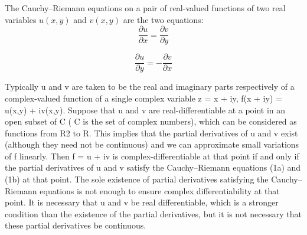 The Cauchy–Riemann equations on a pair of real-valued functions of two real variables $u(x,y)$ and $v(x,y)$ are the two equations:
\[\dfrac{ \partial u }{ \partial x } = \dfrac{ \partial v }{ \partial y }\]

\[\dfrac{ \partial u }{ \partial y } = -\dfrac{ \partial v }{ \partial x }\]

Typically u and v are taken to be the real and imaginary parts respectively of a complex-valued function of a single complex variable z = x + iy, f(x + iy) = u(x,y) + iv(x,y). Suppose that u and v are real-differentiable at a point in an open subset of C ( C is the set of complex numbers), which can be considered as functions from R2 to R. This implies that the partial derivatives of u and v exist (although they need not be continuous) and we can approximate small variations of f linearly. Then f = u + iv is complex-differentiable at that point if and only if the partial derivatives of u and v satisfy the Cauchy–Riemann equations (1a) and (1b) at that point. The sole existence of partial derivatives satisfying the Cauchy–Riemann equations is not enough to ensure complex differentiability at that point. It is necessary that u and v be real differentiable, which is a stronger condition than the existence of the partial derivatives, 
but it is not necessary that these partial derivatives be continuous.
